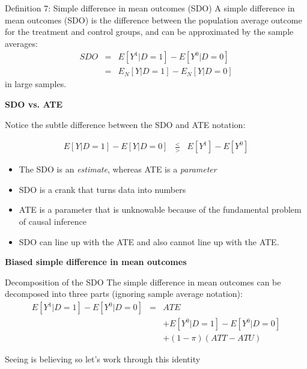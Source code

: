 \documentclass[notes=show]{beamer}
\begin{document}
\begin{frame}[plain]
	\begin{block}{Definition 7: Simple difference in mean outcomes (SDO)}
	A simple difference in mean outcomes (SDO) is the difference between the population average outcome for the treatment and control groups, and can be approximated by the sample averages:\begin{eqnarray*}
	SDO &=& E[Y^1 | D=1] - E[Y^0 | D=0] \\
	&=& E_N[Y | D=1] - E_N[Y | D=0]
	\end{eqnarray*}in large samples. 
\end{block}

\end{frame}

\begin{frame}[plain]
\begin{center}
\textbf{SDO vs. ATE}
\end{center}

Notice the subtle difference between the SDO and ATE notation:

\begin{eqnarray*}
		E[Y | D=1] - E[Y | D=0] &\frac{<}{>}& E[Y^1] - E[Y^0]
		\end{eqnarray*}
\begin{itemize}
	\item The SDO is an \emph{estimate}, whereas ATE is a \emph{parameter}
	\item SDO is a crank that turns data into numbers
	\item ATE is a parameter that is unknowable because of the fundamental problem of causal inference
	\item SDO can line up with the ATE and also cannot line up with the ATE.
\end{itemize}

\end{frame}


\begin{frame}[plain]
	\begin{center}
	\textbf{Biased simple difference in mean outcomes}
	\end{center}
	
	\begin{block}{Decomposition of the SDO}
	The simple difference in mean outcomes can be decomposed into three parts (ignoring sample average notation):
		\begin{eqnarray*}
		E[Y^1 | D=1] - E[Y^0 | D=0]&=& ATE\nonumber \\
		&&+ E[Y^0|D=1] - E[Y^0|D=0] \nonumber \\
		&& + (1-\pi)(ATT - ATU) 
		\end{eqnarray*}
	\end{block}
	Seeing is believing so let's work through this identity
	
\end{frame}
	
\end{document}
